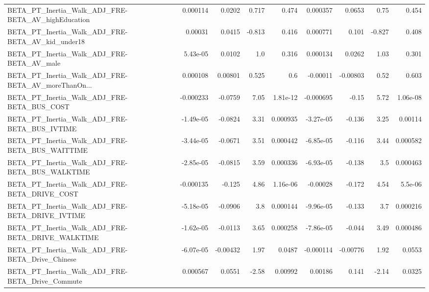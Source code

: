 \begin{tabular}{lrrrrrrrr}
BETA\_PT\_Inertia\_Walk\_ADJ\_FRE-BETA\_AV\_highEducation &    0.000114 &       0.0202 &    0.717 &    0.474 &   0.000357 &      0.0653 &         0.75 &         0.454 \\
BETA\_PT\_Inertia\_Walk\_ADJ\_FRE-BETA\_AV\_kid\_under18   &     0.00031 &       0.0415 &   -0.813 &    0.416 &   0.000771 &       0.101 &       -0.827 &         0.408 \\
BETA\_PT\_Inertia\_Walk\_ADJ\_FRE-BETA\_AV\_male          &    5.43e-05 &       0.0102 &      1.0 &    0.316 &   0.000134 &      0.0262 &         1.03 &         0.301 \\
BETA\_PT\_Inertia\_Walk\_ADJ\_FRE-BETA\_AV\_moreThanOn... &    0.000108 &      0.00801 &    0.525 &      0.6 &   -0.00011 &    -0.00803 &         0.52 &         0.603 \\
BETA\_PT\_Inertia\_Walk\_ADJ\_FRE-BETA\_BUS\_COST         &   -0.000233 &      -0.0759 &     7.05 & 1.81e-12 &  -0.000695 &       -0.15 &         5.72 &      1.06e-08 \\
BETA\_PT\_Inertia\_Walk\_ADJ\_FRE-BETA\_BUS\_IVTIME       &   -1.49e-05 &      -0.0824 &     3.31 & 0.000935 &  -3.27e-05 &      -0.136 &         3.25 &       0.00114 \\
BETA\_PT\_Inertia\_Walk\_ADJ\_FRE-BETA\_BUS\_WAITTIME     &   -3.44e-05 &      -0.0671 &     3.51 & 0.000442 &  -6.85e-05 &      -0.116 &         3.44 &      0.000582 \\
BETA\_PT\_Inertia\_Walk\_ADJ\_FRE-BETA\_BUS\_WALKTIME     &   -2.85e-05 &      -0.0815 &     3.59 & 0.000336 &  -6.93e-05 &      -0.138 &          3.5 &      0.000463 \\
BETA\_PT\_Inertia\_Walk\_ADJ\_FRE-BETA\_DRIVE\_COST       &   -0.000135 &       -0.125 &     4.86 & 1.16e-06 &   -0.00028 &      -0.172 &         4.54 &       5.5e-06 \\
BETA\_PT\_Inertia\_Walk\_ADJ\_FRE-BETA\_DRIVE\_IVTIME     &   -5.18e-05 &      -0.0906 &      3.8 & 0.000144 &  -9.96e-05 &      -0.133 &          3.7 &      0.000216 \\
BETA\_PT\_Inertia\_Walk\_ADJ\_FRE-BETA\_DRIVE\_WALKTIME   &   -1.62e-05 &      -0.0113 &     3.65 & 0.000258 &  -7.86e-05 &      -0.044 &         3.49 &      0.000486 \\
BETA\_PT\_Inertia\_Walk\_ADJ\_FRE-BETA\_Drive\_Chinese    &   -6.07e-05 &     -0.00432 &     1.97 &   0.0487 &  -0.000114 &    -0.00776 &         1.92 &        0.0553 \\
BETA\_PT\_Inertia\_Walk\_ADJ\_FRE-BETA\_Drive\_Commute    &    0.000567 &       0.0551 &    -2.58 &  0.00992 &    0.00186 &       0.141 &        -2.14 &        0.0325 \\

\end{tabular}
